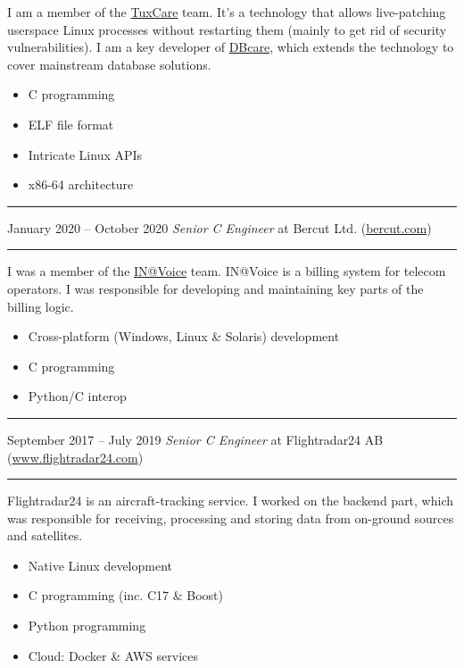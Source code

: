 \documentclass[11pt]{article}
\newcommand\CXX{C\nolinebreak[4]\hspace{-.05em}\raisebox{.4ex}{\relsize{-3}{\textbf{++}}}}
\newcommand\CvSmallSkipLength{0.5em}
\newcommand\CvSkip[1]{\vspace{#1}}
\newcommand\CvSmallSkip{\CvSkip{\CvSmallSkipLength}}
\newcommand\CvRule{\begingroup\color{CvRuleColor}\hrule\endgroup}
\newcommand\CvWorkplaceHeader[5]{\begingroup%
  \CvRule\nopagebreak%
  \fboxsep0pt%
  \colorbox{CvWorkplaceHeaderColor}{%
    \begin{minipage}{\linewidth-2\fboxsep}%
\CvSmallSkip%
#1 -- #2 \hfill \textit{#3} at #4 (\href{http://#5/}{#5})%
\CvSmallSkip%
    \end{minipage}%
  }%
  \CvRule%
\endgroup%
}
\newenvironment{CvWorkplaceDescription}{%
    \begingroup\setlength\parskip{\CvSmallSkipLength}%
  }{%
    \CvSmallSkip\endgroup%
  }
\begin{document}
\begin{CvWorkplaceDescription}
I am a member of the \href{https://tuxcare.com/}{TuxCare} team.
It's a technology that allows live-patching userspace Linux processes without
restarting them (mainly to get rid of security vulnerabilities).
I am a key developer of \href{https://tuxcare.com/live-patching-services/databasecare/}{DBcare},
which extends the technology to cover mainstream database solutions.

\begin{itemize}[noitemsep]
  \item C programming
  \item ELF file format
  \item Intricate Linux APIs
  \item x86-64 architecture
\end{itemize}
\end{CvWorkplaceDescription}

\CvWorkplaceHeader{January 2020}{October 2020}{Senior {\CXX} Engineer}{Bercut Ltd.}{bercut.com}

\begin{CvWorkplaceDescription}
I was a member of the \href{https://bercut.com/products/in-voice/}{IN@Voice}
team.
IN@Voice is a billing system for telecom operators.
I was responsible for developing and maintaining key parts of the billing
logic.

\begin{itemize}[noitemsep]
  \item Cross-platform (Windows, Linux \& Solaris) development
  \item {\CXX} programming
  \item Python/{\CXX} interop
\end{itemize}
\end{CvWorkplaceDescription}

\CvWorkplaceHeader{September 2017}{July 2019}{Senior {\CXX} Engineer}{Flightradar24 AB}{www.flightradar24.com}

\begin{CvWorkplaceDescription}
Flightradar24 is an aircraft-tracking service.
I worked on the backend part, which was responsible for receiving, processing
and storing data from on-ground sources and satellites.

\begin{itemize}[noitemsep]
  \item Native Linux development
  \item {\CXX} programming (inc. {\CXX}17 \& Boost)
  \item Python programming
  \item Cloud: Docker \& AWS services
\end{itemize}
\end{CvWorkplaceDescription}
\end{document}
